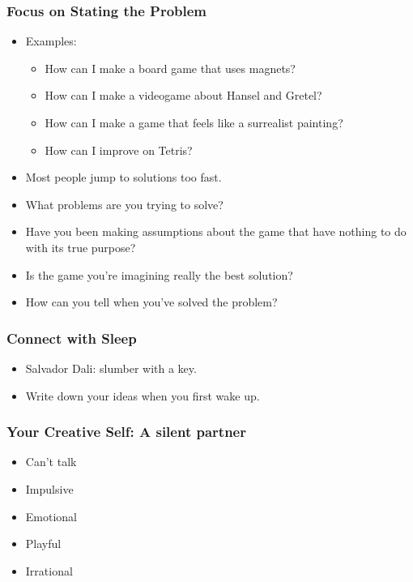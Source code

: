 \documentclass{beamer}
\begin{document}
\begin{frame}
  \frametitle{Focus on Stating the Problem}

\begin{itemize}
\item Examples:
\begin{itemize}
\item How can I make a board game that uses magnets?\pause
\item How can I make a videogame about Hansel and Gretel?\pause
\item How can I make a game that feels like a surrealist painting?\pause
\item How can I improve on Tetris?\pause
\end{itemize}
\item Most people jump to solutions too fast.\pause
\item What problems are you trying to solve?\pause
\item Have you been making assumptions about the game that have
  nothing to do with its true purpose?\pause
\item Is the game you're imagining really the best solution?\pause
\item How can you tell when you've solved the problem?
\end{itemize}

\end{frame}

\begin{frame}
  \frametitle{Connect with Sleep}

\begin{itemize}
\item Salvador Dali:  slumber with a key.\pause
\item Write down your ideas when you first wake up.
\end{itemize}

\end{frame}


\begin{frame}
  \frametitle{Your Creative Self: A silent partner}

\begin{itemize}
\item Can't talk\pause
\item Impulsive\pause
\item Emotional\pause
\item Playful\pause
\item Irrational

\end{itemize}

\end{frame}
\end{document}
